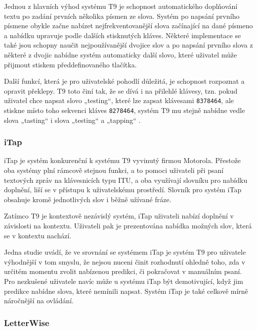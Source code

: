 \documentclass{article}
\begin{document}
Jednou z hlavních výhod systému T9 je schopnost automatického doplňování textu po zadání prvních několika písmen ze slova. Systém po napsání prvního písmene obykle začne nabízet nejfrekventovanější slova začínající na dané písmeno a nabídku upravuje podle dalších stisknutých kláves. Některé implementace se také jsou schopny naučit nejpoužívanější dvojice slov a po napsání prvního slova z některé z dvojic nabídne systém automaticky další slovo, které uživatel může přijmout stiskem předdefinovaného tlačítka. \cite{hrzQ70bvKjUBgVml} 

Další funkcí, která je pro uživatelské pohodlí důležitá, je schopnost rozpoznat a opravit překlepy. T9 toto činí tak, že se dívá i na přilehlé klávesy, tzn. pokud uživatel chce napsat slovo „testing“, které lze zapsat klávesami {\tt 8378464}, ale stiskne místo toho sekvenci kláves {\tt 8278464}, systém T9 mu stejně nabídne vedle slova „tasting“ i slova „testing“ a „tapping“ \cite{hrzQ70bvKjUBgVml}.

\subsubsection{iTap}

iTap je systém konkurenční k systému T9 vyvinutý firmou Motorola. Přestože oba systémy plní rámcově stejnou funkci, a to pomoci uživateli při psaní textových zpráv na klávesnicích typu ITU, a oba využívají slovníku pro nabídku doplnění, liší se v přístupu k uživatelskému prostředí. Slovník pro systém iTap obsahuje kromě jednotlivých slov i běžně užívané fráze.


Zatímco T9 je kontextově nezávislý systém, iTap uživateli nabízí doplnění v závislosti na kontextu. Uživateli pak je prezentována nabídka možných slov, která se v kontextu nachází. 

Jedna studie \cite{lBNMeL7t9XcnqSzq} uvádí, že ve srovnání se systémem iTap je systém T9 pro uživatele výhodnější v tom smyslu, že nejsou nuceni činit rozhodnutí ohledně toho, zda v určitém momentu zvolit nabízenou predikci, či pokračovat v manuálním psaní. Pro nezkušené uživatele navíc může u systému iTap být demotivující, když jim predikce nabídne slova, které nemínili napsat. Systém iTap je také celkově mírně náročnější na ovládání.

\subsubsection{LetterWise}
\end{document}
